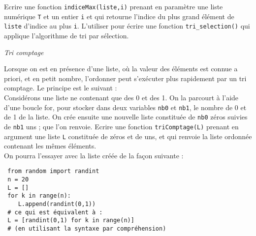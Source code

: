 \ques Ecrire une fonction \texttt{indiceMax(liste,i)} prenant en paramètre une liste numérique \texttt{T} et un entier \texttt{i} et qui retourne l'indice du plus grand élément de \texttt{liste} d'indice au plus \texttt{i}.
\ques L'utiliser pour écrire une fonction \texttt{tri\_selection()} qui applique l'algorithme de tri par sélection.

\textit{Tri comptage}

Lorsque on est en présence d'une liste, où la valeur des éléments est connue a priori, et en petit nombre, l'ordonner peut s'exécuter plus rapidement par un tri comptage. Le principe est le suivant :\\
Considérons une liste ne contenant que des 0 et des 1. On la parcourt à l'aide d'une boucle for, pour stocker dans deux variables \texttt{nb0} et \texttt{nb1}, le nombre de 0 et de 1 de la liste. On crée ensuite une nouvelle liste constituée de \texttt{nb0} zéros suivies de \texttt{nb1} uns ; que l'on renvoie.
\ques Ecrire une fonction \texttt{triComptage(L)} prenant en argument une liste \texttt{L} constituée de zéros et de uns,  et qui renvoie la liste ordonnée contenant les mêmes éléments.\\
On pourra l'essayer avec la liste créée de la façon suivante :
\begin{verbatim}
 from random import randint
 n = 20
 L = []
 for k in range(n):
 	L.append(randint(0,1))
 # ce qui est équivalent à :
 L = [randint(0,1) for k in range(n)]
 # (en utilisant la syntaxe par compréhension)
 \end{verbatim}
